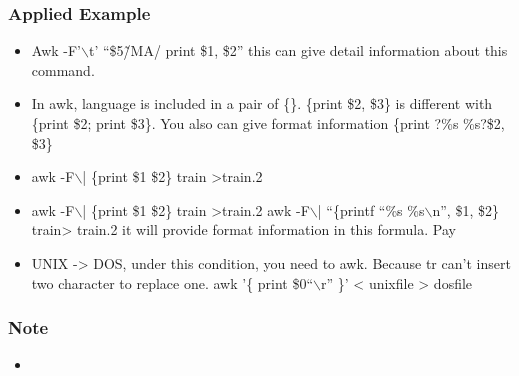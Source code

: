 \documentclass[a4paper,12pt,twoside]{book}
\begin{document}
\begin{CJK*}{UTF8}{song}
	\subsubsection{Applied Example}
		\begin{itemize}
		\item Awk -F'$\backslash$t' ``\$5\~/MA/ {print \$1, \$2}''  this can give detail information about this command.
		\item In awk, language is included in a pair of \{\}. \{print \$2, \$3\} is different with \{print \$2; print \$3\}. You also can give format information \{print ?\%s \%s?\$2, \$3\}
		\item awk -F$\backslash$| \{print \$1 \$2\} train >train.2
		\item awk -F$\backslash$| \{print \$1 \$2\} train >train.2  awk -F$\backslash$| ``\{printf ``\%s \%s$\backslash$n'', \$1, \$2\} train> train.2 it will provide format information in this formula. Pay
		\item UNIX -> DOS, under this condition, you need to  awk. Because tr can't insert two character to replace one. awk '\{ print \$0``$\backslash$r'' \}' < unixfile > dosfile
		\end{itemize}
	\subsubsection{Note}
		\begin{itemize}
		\item
		\end{itemize}


\end{CJK*}
\end{document}
